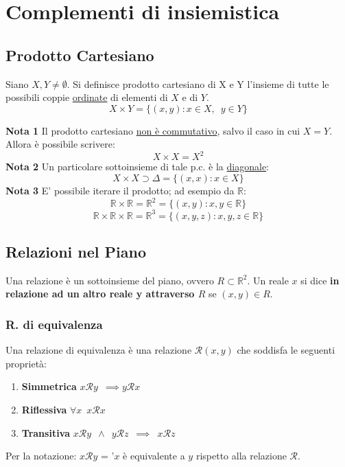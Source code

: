 \documentclass[10pt, oneside]{book}
\theoremstyle{plain}
\begin{document}
\chapter{Complementi di insiemistica}

\section{Prodotto Cartesiano}
\begin{defin}
Siano $X,Y \neq \emptyset $. Si definisce prodotto cartesiano di X e Y l'insieme di tutte le possibili coppie \underline{ordinate} di elementi di $X$ e di $Y$.
\[X \times Y = \{ (x,y) : x \in X, \enspace y \in Y\}\]
\end{defin}
\textbf{Nota 1} Il prodotto cartesiano \underline{non è commutativo}, salvo il caso in cui $X = Y$. Allora è possibile scrivere: \[X \times X = X^2\]
\textbf{Nota 2} Un particolare sottoinsieme di tale p.c. è la \underline{diagonale}: 
\[X \times X \supset \Delta = \{ (x,x) : x \in X\}\]
\textbf{Nota 3} E' possibile iterare il prodotto; ad esempio da  $\mathbb{R}$:
\[\mathbb{R} \times \mathbb{R} = \mathbb{R}^2 = \{(x,y) : x, y \in \mathbb{R}\}\]
\[\mathbb{R} \times \mathbb{R} \times \mathbb{R}= \mathbb{R}^3 = \{(x,y,z) : x, y, z \in \mathbb{R}\}\]

\section{Relazioni nel Piano}
\begin{defin}
Una relazione è un sottoinsieme del piano, ovvero $R \subset \mathbb{R}^2$. Un reale $x$ si dice \textbf{in relazione ad un altro reale y attraverso $R$} se $(x,y) \in R$.
\end{defin}

\subsection{R. di equivalenza}
\begin{defin}
Una relazione di equivalenza è una relazione $\mathcal{R}(x,y)$ che soddisfa le seguenti proprietà:
\begin{enumerate}
    \item \textbf{Simmetrica} $x\mathcal{R}y \enspace \implies y\mathcal{R}x$
    \item \textbf{Riflessiva} $\forall x \enspace x\mathcal{R}x$
    \item \textbf{Transitiva} $x\mathcal{R}y \enspace \land \enspace y\mathcal{R}z\enspace \implies \enspace x\mathcal{R}z$
\end{enumerate}
Per la notazione: $x\mathcal{R}y$ = '$x$ è equivalente a $y$ rispetto alla relazione $\mathcal{R}$.
\end{defin}
\end{document}
